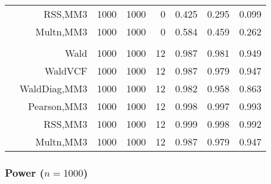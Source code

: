 \documentclass[
]{article}
\begin{document}
\begin{table}[H]
{\begin{tabular}[t]{lrrrrrrr}
\hspace{1em} & RSS,MM3 & 1000 & 1000 & 0 & 0.425 & 0.295 & 0.099\\

\hspace{1em} & Multn,MM3 & 1000 & 1000 & 0 & 0.584 & 0.459 & 0.262\\
\cmidrule{1-8}
\addlinespace[0.3em]
\multicolumn{8}{l}{\textbf{3F 15V}}\\
\hspace{1em} & Wald & 1000 & 1000 & 12 & 0.987 & 0.981 & 0.949\\

\hspace{1em} & WaldVCF & 1000 & 1000 & 12 & 0.987 & 0.979 & 0.947\\

\hspace{1em} & WaldDiag,MM3 & 1000 & 1000 & 12 & 0.982 & 0.958 & 0.863\\

\hspace{1em} & Pearson,MM3 & 1000 & 1000 & 12 & 0.998 & 0.997 & 0.993\\

\hspace{1em} & RSS,MM3 & 1000 & 1000 & 12 & 0.999 & 0.998 & 0.992\\

\hspace{1em} & Multn,MM3 & 1000 & 1000 & 12 & 0.987 & 0.979 & 0.947\\
\bottomrule
\end{tabular}}
\endgroup{}
\end{table}

\hypertarget{power-n1000}{%
\subsubsection{\texorpdfstring{Power
(\(n=1000\))}{Power (n=1000)}}\label{power-n1000}}
\end{document}

